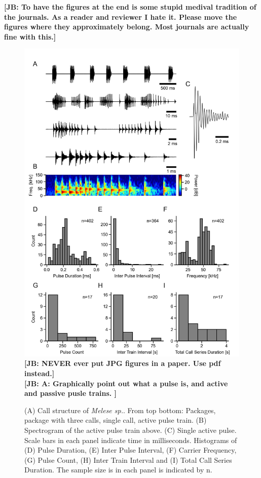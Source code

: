 \documentclass[12pt,a4paper]{article}
\newcommand{\species}[1]{\textit{#1}}
\newcommand{\note}[2][]{\textbf{[#1: #2]}}
\newcommand{\notejb}[1]{\note[JB]{#1}}
\begin{document}
\notejb{To have the figures at the end is some stupid medival
  tradition of the journals. As a reader and reviewer I hate
  it. Please move the figures where they approximately belong. Most
  journals are actually fine with this.}
\begin{figure}[h!]
	\centering
	\includegraphics{figures/Fig_01.jpeg}
        \notejb{NEVER ever put JPG figures in a paper. Use pdf instead.}\\
        \notejb{A: Graphically point out what a pulse is, and active and passive pusle trains. }
	\caption{\label{fig:01}(A) Call structure of \species{Melese sp.}. From top bottom: Packages, package with three calls, single call, active pulse train. (B) Spectrogram of the active pulse train above. (C) Single active pulse. Scale bars in each panel indicate time in milliseconds.
    Histograms of (D) Pulse Duration, (E) Inter Pulse Interval, (F) Carrier Frequency, (G) Pulse Count, (H) Inter Train Interval and (I) Total Call Series Duration. The sample size is in each panel is indicated by n.}
\end{figure}
\end{document}
